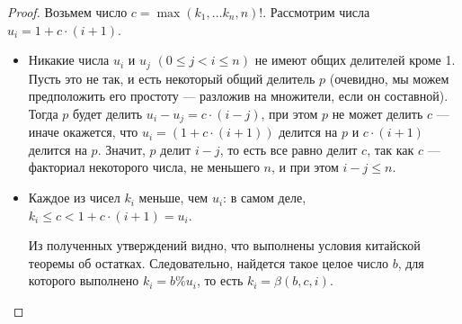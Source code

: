 \begin{proof}
Возьмем число $c = \max(k_1,\dots k_n,n)!$. Рассмотрим числа $u_i = 1 + c \cdot (i+1)$. 

\begin{itemize}

\item Никакие числа $u_i$ и $u_j$ $(0 \le j < i \le n)$ не имеют общих делителей кроме 1.
Пусть это не так, и есть некоторый общий делитель $p$ (очевидно, мы можем предположить его
простоту --- разложив на множители, если он составной).
Тогда $p$ будет делить $u_i - u_j = c \cdot (i - j)$,
при этом $p$ не может делить $c$ --- иначе окажется, что $u_i = (1 + c \cdot (i+1))$ делится на $p$
и $c \cdot (i+1)$ делится на $p$. Значит, $p$ делит $i-j$, то есть все равно делит $c$, так как
$c$ --- факториал некоторого числа, не меньшего $n$, и при этом $i-j \le n$.

\item Каждое из чисел $k_i$ меньше, чем $u_i$: в самом деле, $k_i \le c < 1 + c \cdot (i+1) = u_i$.

Из полученных утверждений видно, что выполнены условия китайской 
теоремы об остатках.
Следовательно, найдется такое целое число $b$, для которого 
выполнено $k_i = b \% u_i$, то есть $k_i = \beta (b,c,i)$.
\end{itemize}
\end{proof}

